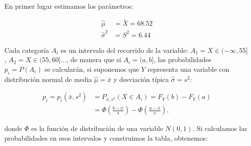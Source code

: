 \documentclass[
]{article}
\begin{document}
En primer lugar estimamos los parámetros:

\[
\begin{aligned}
\hat{\mu} & =\bar{X}=68.52 \\
\hat{\sigma}^{2} & =S^{2}=6.44
\end{aligned}
\]

Cada categoría \(A_{i}\) es un intervalo del recorrido de la variable: \(A_{1}=X \in (-\infty, 55]\), \(A_{2}=X \in(55,60] \ldots\), de manera que si \(A_{i}=(a, b]\), las probabilidades \(p_{i}=P\left(A_{i}\right)\) se calcularán, si suponemos que \(Y\) representa una variable con distribución normal de media \(\hat{\mu}=\bar{x}\) y desviación típica \(\hat{\sigma}=s^{2}\):

\[
\begin{aligned}
p_{i}=p_{i}\left(\bar{x}, s^{2}\right) & =P_{\bar{x}, s^{2}}\left(X \in A_{i}\right)=F_{Y}(b)-F_{Y}(a) \\
& =\Phi\left(\frac{b-\bar{x}}{s}\right)-\Phi\left(\frac{a-\bar{x}}{s}\right),
\end{aligned}
\]

donde \(\Phi\) es la función de distribución de una variable \(N(0,1)\). Si calculamos las probabilidades en esos intervalos y construimos la tabla, obtenemos:
\end{document}
